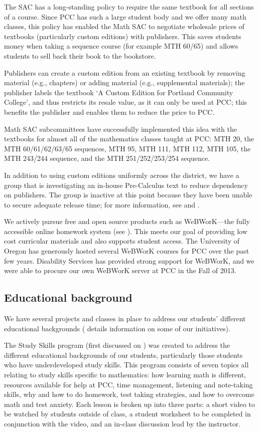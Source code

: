 The SAC has a long-standing policy to require the same textbook for all sections of a course.
Since PCC has such a large student body and we offer many math classes, this policy has enabled the Math SAC to negotiate wholesale prices of textbooks (particularly custom editions) with publishers.
This saves students money when taking a sequence course (for example MTH 60/65) and allows students to sell back their book to the bookstore.

Publishers can create a custom edition from an existing textbook by removing material (e.g., chapters) or adding material (e.g., supplemental materials); the publisher labels the textbook `A Custom Edition for Portland Community College', and thus restricts its resale value, as it can only be used at PCC; this benefits the publisher and enables them to reduce the price to PCC.

Math SAC subcommittees have successfully implemented this idea with the textbooks for almost all of the mathematics classes taught at PCC: MTH 20, the MTH 60/61/62/63/65 sequences, MTH 95, MTH 111, MTH 112, MTH 105, the MTH 243/244 sequence, and the MTH 251/252/253/254 sequence.

In addition to using custom editions uniformly across the district, we have a group that is investigating an in-house Pre-Calculus text to reduce dependency on publishers.
The group is inactive at this point because they have been unable to secure adequate release time; for more information, see  and \cite{mth111project}.

We actively pursue free and open source products such as WeBWorK---the fully accessible online homework system (see ).
This meets our goal of providing low cost curricular materials and also supports student access.
The University of Oregon has generously hosted several WeBWorK courses for PCC over the past few years.
Disability Services has provided strong support for WeBWorK, and we were able to procure our own WeBWorK server at PCC in the Fall of 2013.

\subsection{Educational background}
We have several projects and classes in place to address our students' different educational backgrounds ( details information on some of our initiatives).

The Study Skills program (first discussed on ) was created to address the different educational backgrounds of our students, particularly those students who have underdeveloped study skills.
This program consists of seven topics all relating to study skills specific to mathematics: how learning math is different, resources available for help at PCC, time management, listening and note-taking skills, why and how to do homework, test taking strategies, and how to overcome math and test anxiety.
Each lesson is broken up into three parts: a short video to be watched by students outside of class, a student worksheet to be completed in conjunction with the video, and an in-class discussion lead by the instructor.

